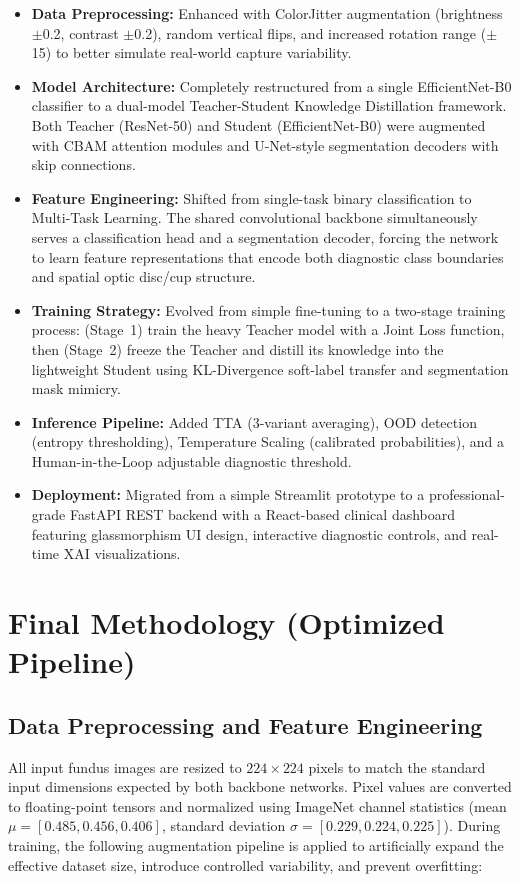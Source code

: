 \documentclass[conference]{IEEEtran}
\begin{document}
\begin{itemize}
    \item \textbf{Data Preprocessing:} Enhanced with ColorJitter augmentation (brightness $\pm$0.2, contrast $\pm$0.2), random vertical flips, and increased rotation range ($\pm$15\textdegree) to better simulate real-world capture variability.
    \item \textbf{Model Architecture:} Completely restructured from a single EfficientNet-B0 classifier to a dual-model Teacher-Student Knowledge Distillation framework. Both Teacher (ResNet-50) and Student (EfficientNet-B0) were augmented with CBAM attention modules and U-Net-style segmentation decoders with skip connections.
    \item \textbf{Feature Engineering:} Shifted from single-task binary classification to Multi-Task Learning. The shared convolutional backbone simultaneously serves a classification head and a segmentation decoder, forcing the network to learn feature representations that encode both diagnostic class boundaries and spatial optic disc/cup structure.
    \item \textbf{Training Strategy:} Evolved from simple fine-tuning to a two-stage training process: (Stage~1) train the heavy Teacher model with a Joint Loss function, then (Stage~2) freeze the Teacher and distill its knowledge into the lightweight Student using KL-Divergence soft-label transfer and segmentation mask mimicry.
    \item \textbf{Inference Pipeline:} Added TTA (3-variant averaging), OOD detection (entropy thresholding), Temperature Scaling (calibrated probabilities), and a Human-in-the-Loop adjustable diagnostic threshold.
    \item \textbf{Deployment:} Migrated from a simple Streamlit prototype to a professional-grade FastAPI REST backend with a React-based clinical dashboard featuring glassmorphism UI design, interactive diagnostic controls, and real-time XAI visualizations.
\end{itemize}

\section{Final Methodology (Optimized Pipeline)}

\subsection{Data Preprocessing and Feature Engineering}
All input fundus images are resized to $224 \times 224$ pixels to match the standard input dimensions expected by both backbone networks. Pixel values are converted to floating-point tensors and normalized using ImageNet channel statistics (mean $\mu = [0.485, 0.456, 0.406]$, standard deviation $\sigma = [0.229, 0.224, 0.225]$). During training, the following augmentation pipeline is applied to artificially expand the effective dataset size, introduce controlled variability, and prevent overfitting:
\end{document}
